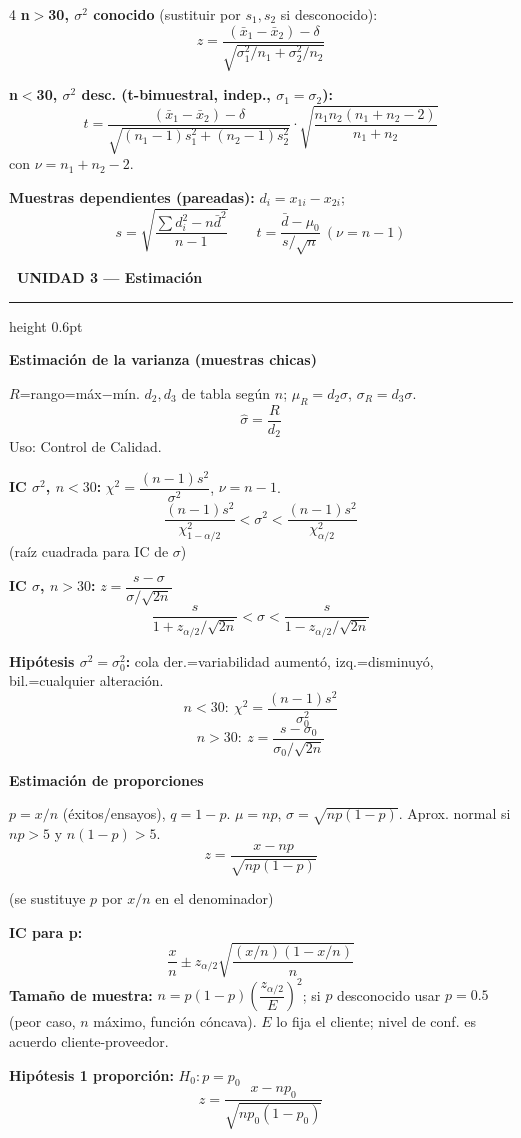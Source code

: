 \documentclass[9pt,a4paper]{article}
\newcommand{\bodysize}{\fontsize{9.2}{10.8}\selectfont}
\newcommand{\notesize}{\fontsize{7.8}{9.1}\selectfont}
\newcommand{\subsize}{\fontsize{10.5}{12.3}\selectfont\bfseries}
\newcommand{\unitsize}{\fontsize{13.5}{15.5}\selectfont\bfseries}
\newcommand{\unithead}[2]{%
  \par\vspace{2.5pt}
  \noindent\colorbox{#1!22}{\textcolor{#1!65!black}{\unitsize\ #2}}%
  \par\vspace{1.5pt}\hrule height 0.6pt \color{#1!55!black}\vspace{2pt}\color{black}%
}
\newcommand{\topic}[2]{\subsize\textcolor{#1!60!black}{#2}\par\vspace{0.5pt}\bodysize}
\begin{document}
\begin{multicols}{4}
\textbf{n$>$30, $\sigma^2$ conocido} (sustituir por $s_1,s_2$ si desconocido):
\[
z=\frac{(\bar{x}_1-\bar{x}_2)-\delta}{\sqrt{\sigma_1^2/n_1+\sigma_2^2/n_2}}
\]

\textbf{n$<$30, $\sigma^2$ desc. (t-bimuestral, indep., $\sigma_1=\sigma_2$):}
{\notesize
\[
t=\frac{(\bar{x}_1-\bar{x}_2)-\delta}{\sqrt{(n_1-1)s_1^2+(n_2-1)s_2^2}}\cdot\sqrt{\frac{n_1n_2(n_1+n_2-2)}{n_1+n_2}}
\]
}con $\nu=n_1+n_2-2$.

\textbf{Muestras dependientes (pareadas):} $d_i=x_{1i}-x_{2i}$;
\[
s=\sqrt{\frac{\sum d_i^2-n\bar{d}^2}{n-1}} \qquad t=\frac{\bar{d}-\mu_0}{s/\sqrt{n}} \ (\nu=n-1)
\]

\unithead{teal}{UNIDAD 3 --- Estimación}

\topic{teal}{Estimación de la varianza (muestras chicas)}
$R$=rango=máx$-$mín. $d_2,d_3$ de tabla según $n$; $\mu_R=d_2\sigma$, $\sigma_R=d_3\sigma$.
\[
\hat{\sigma}=\frac{R}{d_2}
\]
Uso: Control de Calidad.

\textbf{IC $\sigma^2$, $n<30$:} $\chi^2=\dfrac{(n-1)s^2}{\sigma^2}$, $\nu=n-1$.
\[
\frac{(n-1)s^2}{\chi^2_{1-\alpha/2}}<\sigma^2<\frac{(n-1)s^2}{\chi^2_{\alpha/2}}
\]
(raíz cuadrada para IC de $\sigma$)

\textbf{IC $\sigma$, $n>30$:} $z=\dfrac{s-\sigma}{\sigma/\sqrt{2n}}$
\[
\frac{s}{1+z_{\alpha/2}/\sqrt{2n}}<\sigma<\frac{s}{1-z_{\alpha/2}/\sqrt{2n}}
\]

\textbf{Hipótesis $\sigma^2=\sigma_0^2$:} cola der.=variabilidad aumentó, izq.=disminuyó, bil.=cualquier alteración.
\[
n<30:\ \chi^2=\frac{(n-1)s^2}{\sigma_0^2}
\]
\[
n>30:\ z=\frac{s-\sigma_0}{\sigma_0/\sqrt{2n}}
\]

\topic{teal}{Estimación de proporciones}
$p=x/n$ (éxitos/ensayos), $q=1-p$. $\mu=np$, $\sigma=\sqrt{np(1-p)}$. Aprox. normal si $np>5$ y $n(1-p)>5$.
\[
z=\frac{x-np}{\sqrt{np(1-p)}}
\]
{\notesize (se sustituye $p$ por $x/n$ en el denominador)\par}\bodysize
\textbf{IC para p:}
\[
\frac{x}{n}\pm z_{\alpha/2}\sqrt{\frac{(x/n)(1-x/n)}{n}}
\]
\textbf{Tamaño de muestra:} $n=p(1-p)\left(\dfrac{z_{\alpha/2}}{E}\right)^2$; si $p$ desconocido usar $p=0.5$ (peor caso, $n$ máximo, función cóncava). $E$ lo fija el cliente; nivel de conf. es acuerdo cliente-proveedor.

\textbf{Hipótesis 1 proporción:} $H_0: p=p_0$
\[
z=\frac{x-np_0}{\sqrt{np_0(1-p_0)}}
\]


\end{multicols}
\end{document}
